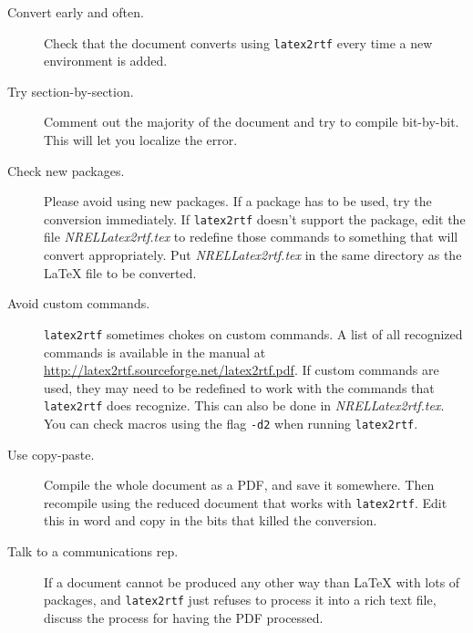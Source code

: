 \begin{description}
\item[Convert early and often.] Check that the document converts using \texttt{latex2rtf} every time a new environment is added.
\item[Try section-by-section.] Comment out the majority of the document and try to compile bit-by-bit. This will let you localize the error.
\item[Check new packages.] Please avoid using new packages. If a package has to be used, try the conversion immediately. If \texttt{latex2rtf} doesn't support the package, edit the file \emph{NRELLatex2rtf.tex} to redefine those commands to something that will convert appropriately. Put \emph{NRELLatex2rtf.tex} in the same directory as the LaTeX file to be converted.
\item[Avoid custom commands.] \texttt{latex2rtf} sometimes chokes on custom commands. A list of all recognized commands is available in the manual at \href{http://latex2rtf.sourceforge.net/latex2rtf.pdf}{http://latex2rtf.sourceforge.net/latex2rtf.pdf}. If custom commands are used, they may need to be redefined to work with the commands that \texttt{latex2rtf} does recognize. This can also be done in \emph{NRELLatex2rtf.tex}. You can check macros using the flag \verb+-d2+ when running \texttt{latex2rtf}.
\item[Use copy-paste.] Compile the whole document as a PDF, and save it somewhere. Then recompile using the reduced document that works with \texttt{latex2rtf}. Edit this in word and copy in the bits that killed the conversion.
\item[Talk to a communications rep.] If a document cannot be produced any other way than LaTeX with lots of packages, and \texttt{latex2rtf} just refuses to process it into a rich text file, discuss the process for having the PDF processed.
\end{description}
